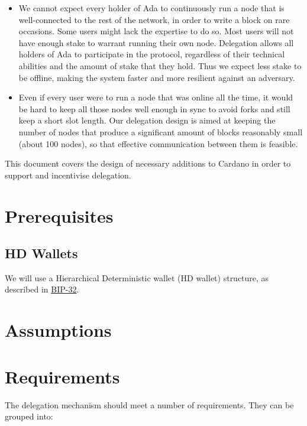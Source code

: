 \documentclass[11pt,a4paper]{article}
\begin{document}
\begin{itemize}
\item
  We cannot expect every holder of Ada to continuously run a node that
  is well-connected to the rest of the network, in order to write a
  block on rare occasions. Some users might lack the expertise to do so.
  Most users will not have enough stake to warrant running their own
  node. Delegation allows all holders of Ada to participate in the
  protocol, regardless of their technical abilities and the amount of
  stake that they hold. Thus we expect less stake to be offline, making
  the system faster and more resilient against an adversary.
\item
  Even if every user were to run a node that was online all the time, it
  would be hard to keep all those nodes well enough in sync to avoid
  forks and still keep a short slot length. Our delegation design is
  aimed at keeping the number of nodes that produce a significant amount
  of blocks reasonably small (about 100 nodes), so that effective
  communication between them is feasible.
\end{itemize}

This document covers the design of necessary additions to Cardano in
order to support and incentivise delegation.

\section{Prerequisites}\label{prerequisites}

\subsection{HD Wallets}\label{hd-wallets}

We will use a Hierarchical Deterministic wallet (HD wallet) structure,
as described in
\href{https://github.com/bitcoin/bips/blob/master/bip-0032.mediawiki.}{BIP-32}.

\section{Assumptions}\label{assumptions}

\section{Requirements}\label{requirements}

The delegation mechanism should meet a number of requirements. They can
be grouped into:
\end{document}
